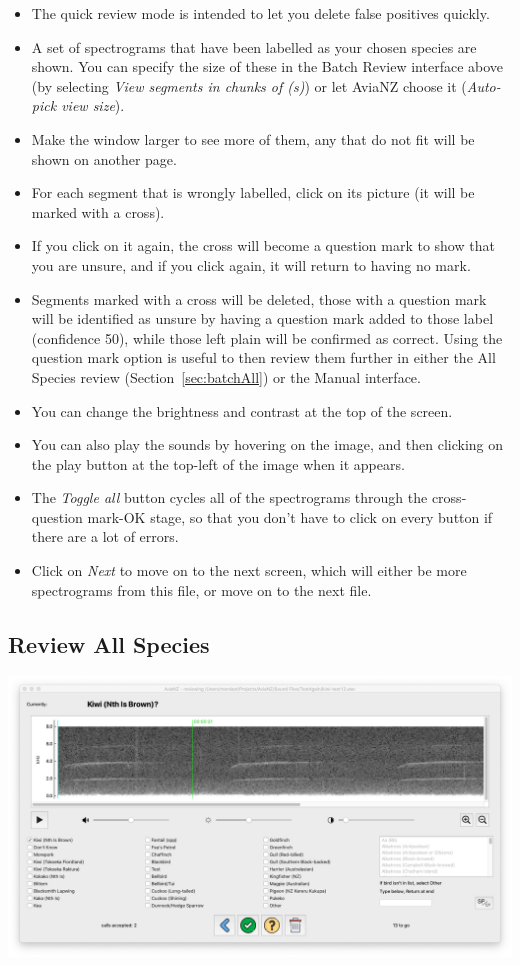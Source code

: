 \documentclass{scrartcl}
\begin{document}
\begin{itemize}
\item The quick review mode is intended to let you delete false positives quickly. 
\item A set of spectrograms that have been labelled as your chosen species are shown. You can specify the size of these in the Batch Review interface above (by selecting \textit{View segments in chunks of (s)}) or let AviaNZ choose it (\textit{Auto-pick view size}).
\item Make the window larger to see more of them, any that do not fit will be shown on another page. 
\item For each segment that is wrongly labelled, click on its picture (it will be marked with a cross). 
\item If you click on it again, the cross will become a question mark to show that you are unsure, and if you click again, it will return to having no mark. 
\item Segments marked with a cross will be deleted, those with a question mark will be identified as unsure by having a question mark added to those label (confidence 50), while those left plain will be confirmed as correct. Using the question mark option is useful to then review them further in either the All Species review (Section~\ref{sec:batchAll}) or the Manual interface.
\item You can change the brightness and contrast at the top of the screen.
\item You can also play the sounds by hovering on the image, and then clicking on the play button at the top-left of the image when it appears. 
\item The \textit{Toggle all} button cycles all of the spectrograms through the cross-question mark-OK stage, so that you don't have to click on every button if there are a lot of errors. 
\item Click on \textit{Next} to move on to the next screen, which will either be more spectrograms from this file, or move on to the next file. 
\end{itemize}

\subsection{Review All Species\label{sec:batchAll}}
\begin{center}
	\includegraphics[width=.95\textwidth]{Figures/BatchReview3}
\end{center}
\end{document}
